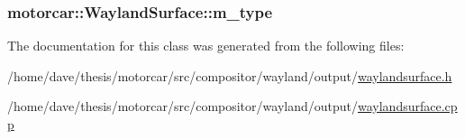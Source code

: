 \hypertarget{classmotorcar_1_1WaylandSurface_a73fc5c245e98a08a551c7f412fd95966}{
\subsubsection[{m\-\_\-type}]{ motorcar\-::\-Wayland\-Surface\-::m\-\_\-type\hspace{0.3cm}{\ttfamily [protected]}}}\label{classmotorcar_1_1WaylandSurface_a73fc5c245e98a08a551c7f412fd95966}


The documentation for this class was generated from the following files\-:\begin{DoxyCompactItemize}
\item 
/home/dave/thesis/motorcar/src/compositor/wayland/output/\hyperlink{waylandsurface_8h}{waylandsurface.\-h}\item 
/home/dave/thesis/motorcar/src/compositor/wayland/output/\hyperlink{waylandsurface_8cpp}{waylandsurface.\-cpp}\end{DoxyCompactItemize}
